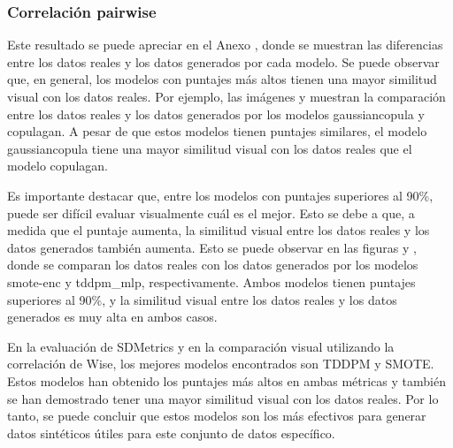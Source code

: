 \subsubsection{Correlación pairwise}
Este resultado se puede apreciar en el Anexo , donde se muestran las diferencias entre los datos reales y los datos generados por cada modelo. Se puede observar que, en general, los modelos con puntajes más altos tienen una mayor similitud visual con los datos reales. Por ejemplo, las imágenes  y  muestran la comparación entre los datos reales y los datos generados por los modelos gaussiancopula y copulagan. A pesar de que estos modelos tienen puntajes similares, el modelo gaussiancopula tiene una mayor similitud visual con los datos reales que el modelo copulagan.





\newpage 
Es importante destacar que, entre los modelos con puntajes superiores al 90\%, puede ser difícil evaluar visualmente cuál es el mejor. Esto se debe a que, a medida que el puntaje aumenta, la similitud visual entre los datos reales y los datos generados también aumenta. Esto se puede observar en las figuras  y , donde se comparan los datos reales con los datos generados por los modelos smote-enc y tddpm\_mlp, respectivamente. Ambos modelos tienen puntajes superiores al 90\%, y la similitud visual entre los datos reales y los datos generados es muy alta en ambos casos.





En la evaluación de SDMetrics y en la comparación visual utilizando la correlación de Wise, los mejores modelos encontrados son TDDPM y SMOTE. Estos modelos han obtenido los puntajes más altos en ambas métricas y también se han demostrado tener una mayor similitud visual con los datos reales. Por lo tanto, se puede concluir que estos modelos son los más efectivos para generar datos sintéticos útiles para este conjunto de datos específico.


